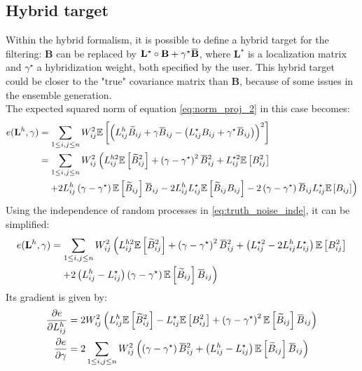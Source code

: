 \documentclass[12pt]{scrartcl}
\newcommand{\overbar}[1]{\mkern 1.5mu\overline{\mkern-1.5mu#1\mkern-1.5mu}\mkern 1.5mu}
\begin{document}
\subsection{Hybrid target}
Within the hybrid formalism, it is possible to define a hybrid target for the filtering: $\mathbf{B}$ can be replaced by $\mathbf{L}^\star \circ \mathbf{B} + \gamma^\star \overbar{\mathbf{B}}$, where $\mathbf{L}^\star$ is a localization matrix and $\gamma^\star$ a hybridization weight, both specified by the user. This hybrid target could be closer to the "true" covariance matrix than $\mathbf{B}$, because of some issues in the ensemble generation.\\
$  $\\
The expected squared norm of equation \eqref{eq:norm_proj_2} in this case becomes:
\begin{align}
e(\mathbf{L}^h,\gamma) & = \sum_{1 \le i,j \le n} W_{ij}^2 \mathbb{E}\left[ \left(L^h_{ij} \widetilde{B}_{ij} + \gamma \overbar{B}_{ij} - \left(L_{ij}^\star B_{ij} + \gamma^\star \overbar{B}_{ij}\right) \right)^2 \right] \nonumber \\
& = \sum_{1 \le i,j \le n} W_{ij}^2 \left(L^{h2}_{ij} \mathbb{E} \left[\widetilde{B}_{ij}^2\right] + \left(\gamma - \gamma^\star \right)^2 \overbar{B}_{ij}^2 + L_{ij}^{\star2} \mathbb{E} \left[B^2_{ij}\right] \right. \nonumber \\
& \left. \quad + 2 L^h_{ij} \left(\gamma - \gamma^\star \right) \mathbb{E} \left[\widetilde{B}_{ij}\right] \overbar{B}_{ij} - 2 L^h_{ij} L_{ij}^\star \mathbb{E} \left[\widetilde{B}_{ij} B_{ij}\right] - 2 \left(\gamma - \gamma^\star \right) \overbar{B}_{ij} L_{ij}^\star \mathbb{E} \left[B_{ij}\right] \right)
\end{align}
Using the independence of random processes in \eqref{eq:truth_noise_inde}, it can be simplified:
\begin{align}
e(\mathbf{L}^h,\gamma) & = \sum_{1 \le i,j \le n} W_{ij}^2 \left(L^{h2}_{ij} \mathbb{E} \left[\widetilde{B}_{ij}^2\right] + \left(\gamma - \gamma^\star \right)^2 \overbar{B}_{ij}^2 + \left(L_{ij}^{\star2} - 2 L^h_{ij} L_{ij}^\star \right) \mathbb{E} \left[B^2_{ij}\right] \right. \nonumber \\
& \left. \quad + 2 \left(L^h_{ij} - L_{ij}^\star\right) \left(\gamma - \gamma^\star \right) \mathbb{E} \left[\widetilde{B}_{ij}\right] \overbar{B}_{ij} \right)
\end{align}
Its gradient is given by:
\begin{subequations}
\begin{align}
\frac{\partial e}{\partial L^h_{ij}} & = 2 W_{ij}^2 \left(L^h_{ij} \mathbb{E} \left[\widetilde{B}_{ij}^2\right] - L_{ij}^\star \mathbb{E} \left[B^2_{ij}\right] + \left(\gamma - \gamma^\star \right)^2 \mathbb{E} \left[\widetilde{B}_{ij}\right] \overbar{B}_{ij} \right) \\
\frac{\partial e}{\partial \gamma} & = 2 \sum_{1 \le i,j \le n} W_{ij}^2 \left(\left(\gamma - \gamma^\star \right) \overbar{B}_{ij}^2 + \left(L^h_{ij} - L_{ij}^\star\right) \mathbb{E} \left[\widetilde{B}_{ij}\right] \overbar{B}_{ij} \right)
\end{align}
\end{subequations}
\end{document}
